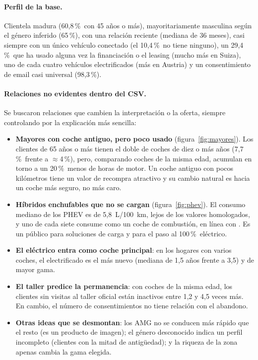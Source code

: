 \documentclass[11pt,a4paper]{article}
\newcommand{\pct}{\,\%}
\begin{document}
\paragraph{Perfil de la base.} Clientela madura (60,8\pct\ con 45 años o más), mayoritariamente masculina según el
género inferido (65\pct), con una relación reciente (mediana de 36 meses), casi siempre con un único vehículo conectado
(el 10,4\pct\ no tiene ninguno), un 29,4\pct\ que ha usado alguna vez la financiación o el leasing (mucho más en Suiza),
uno de cada cuatro vehículos electrificados (más en Austria) y un consentimiento de email casi universal (98,3\pct).

\paragraph{Relaciones no evidentes dentro del CSV.} Se buscaron relaciones que cambien la interpretación o la oferta,
siempre controlando por la explicación más sencilla:
\begin{itemize}
  \item \textbf{Mayores con coche antiguo, pero poco usado} (figura~\ref{fig:mayores}). Los clientes de 65 años o más
        tienen el doble de coches de diez o más años (7,7\pct\ frente a $\approx$4\pct), pero, comparando coches de la
        misma edad, acumulan en torno a un 20\pct\ menos de horas de motor. Un coche antiguo con pocos kilómetros tiene un
        valor de recompra atractivo y su cambio natural es hacia un coche más seguro, no más caro.
  \item \textbf{Híbridos enchufables que no se cargan} (figura~\ref{fig:phev}). El consumo mediano de los PHEV es de
        5,8~L/100~km, lejos de los valores homologados, y uno de cada siete consume como un coche de combustión, en línea
        con \textcite{plotz2021}. Es un público para soluciones de carga y para el paso al 100\pct\ eléctrico.
  \item \textbf{El eléctrico entra como coche principal}: en los hogares con varios coches, el electrificado es el más
        nuevo (mediana de 1,5 años frente a 3,5) y de mayor gama.
  \item \textbf{El taller predice la permanencia}: con coches de la misma edad, los clientes sin visitas al taller
        oficial están inactivos entre 1,2 y 4,5 veces más. En cambio, el número de consentimientos no tiene relación con
        el abandono.
  \item \textbf{Otras ideas que se desmontan}: los AMG no se conducen más rápido que el resto (es un producto de
        imagen); el género desconocido indica un perfil incompleto (clientes con la mitad de antigüedad); y la riqueza de
        la zona apenas cambia la gama elegida.
\end{itemize}
\end{document}

